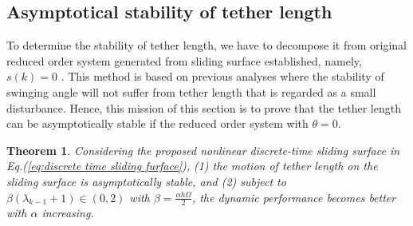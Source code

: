 \documentclass[10pt,onecolumn,draftcls]{IEEEtran}
\newtheorem{mythm}{Theorem}
\begin{document}
	\subsection{Asymptotical stability of tether length}\label{subsec:astl}
	To determine the stability of tether length, we have to decompose it from original reduced order  system generated from sliding surface established, namely, $s(k)=0$ . This method is based on previous analyses where the stability of swinging angle will not suffer from tether length that is regarded as a small disturbance. Hence, this mission of this section is to prove that the tether length can be asymptotically stable if the reduced order  system with $\theta = 0$. 
	\begin{mythm}
		Considering the proposed nonlinear discrete-time sliding surface in Eq.(\ref{eq:discrete time sliding furface}),  (1) the motion of tether length on the sliding surface is asymptotically stable, and (2) subject to $\beta(\lambda_{k-1}+1)\in(0,2)$ with $\beta = \frac{\alpha h\Omega}{2}$, the dynamic performance becomes better with $\alpha$ increasing.  
	\end{mythm}
\end{document}
